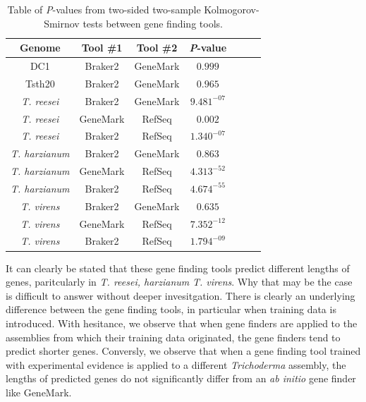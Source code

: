 \begin{table}
  \begin{center}
    \begin{tabular}{|c|c|c|c|c|c|c|}
      \hline
      Genome & Tool \#1 & Tool \#2 & \textit{P}-value  \\ \hline
      DC1 & Braker2 & GeneMark & $0.999$ \\ \hline
      Tsth20 & Braker2 & GeneMark & $0.965$ \\ \hline
      \textit{T. reesei} & Braker2 & GeneMark & $9.481^{-07}$ \\ \hline
      \textit{T. reesei} & GeneMark & RefSeq & $0.002$ \\ \hline
      \textit{T. reesei} & Braker2 & RefSeq & $1.340^{-07}$ \\ \hline
      \textit{T. harzianum} & Braker2 & GeneMark & $0.863$ \\ \hline
      \textit{T. harzianum} & GeneMark & RefSeq & $4.313^{-52}$ \\ \hline
      \textit{T. harzianum} & Braker2 & RefSeq & $4.674^{-55}$ \\ \hline
      \textit{T. virens} & Braker2 & GeneMark & $0.635$ \\ \hline
      \textit{T. virens} & GeneMark & RefSeq & $7.352^{-12}$ \\ \hline
      \textit{T. virens} & Braker2 & RefSeq & $1.794^{-09}$ \\ \hline
    \end{tabular}
  \end{center}
  \caption{Table of \textit{P}-values from two-sided two-sample
    Kolmogorov-Smirnov tests between gene finding tools.}
  \label{table:ks-2s}
\end{table}

It can clearly be stated that these gene finding tools predict
different lengths of genes, paritcularly in \textit{T. reesei,
  harzianum} \textit{T. virens}. Why that may be the case is difficult
to answer without deeper invesitgation. There is clearly an underlying
difference between the gene finding tools, in particular when training
data is introduced. With hesitance, we observe that when gene finders
are applied to the assemblies from which their training data
originated, the gene finders tend to predict shorter genes. Conversly,
we observe that when a gene finding tool trained with experimental
evidence is applied to a different \textit{Trichoderma} assembly, the
lengths of predicted genes do not significantly differ from an
\textit{ab initio} gene finder like GeneMark.
